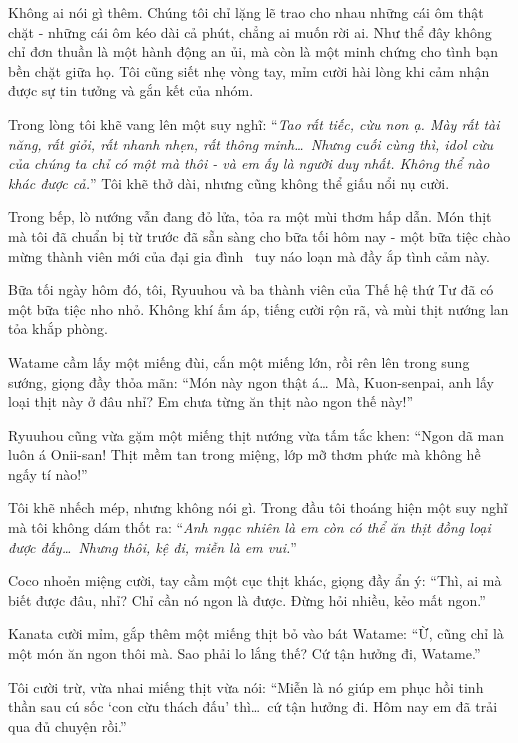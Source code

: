 \documentclass[../main.tex]{subfiles}
\begin{document}
Không ai nói gì thêm. Chúng tôi chỉ lặng lẽ trao cho nhau những cái ôm thật chặt - những cái ôm kéo dài cả phút, chẳng ai muốn rời ai. Như thể đây không chỉ đơn thuần là một hành động an ủi, mà còn là một minh chứng cho tình bạn bền chặt giữa họ. Tôi cũng siết nhẹ vòng tay, mỉm cười hài lòng khi cảm nhận được sự tin tưởng và gắn kết của nhóm.

Trong lòng tôi khẽ vang lên một suy nghĩ: ``\textit{Tao rất tiếc, cừu non ạ. Mày rất tài năng, rất giỏi, rất nhanh nhẹn, rất thông minh\dots\ Nhưng cuối cùng thì, idol cừu của chúng ta chỉ có một mà thôi - và em ấy là người duy nhất. Không thể nào khác được cả.}'' Tôi khẽ thở dài, nhưng cũng không thể giấu nổi nụ cười.

Trong bếp, lò nướng vẫn đang đỏ lửa, tỏa ra một mùi thơm hấp dẫn. Món thịt mà tôi đã chuẩn bị từ trước đã sẵn sàng cho bữa tối hôm nay - một bữa tiệc chào mừng thành viên mới của đại gia đình \hll\ tuy náo loạn mà đầy ắp tình cảm này.

\ct

Bữa tối ngày hôm đó, tôi, Ryuuhou và ba thành viên của Thế hệ thứ Tư đã có một bữa tiệc nho nhỏ. Không khí ấm áp, tiếng cười rộn rã, và mùi thịt nướng lan tỏa khắp phòng.

Watame cầm lấy một miếng đùi, cắn một miếng lớn, rồi rên lên trong sung sướng, giọng đầy thỏa mãn: ``Món này ngon thật á\dots\ Mà, Kuon-senpai, anh lấy loại thịt này ở đâu nhỉ? Em chưa từng ăn thịt nào ngon thế này!''

Ryuuhou cũng vừa gặm một miếng thịt nướng vừa tấm tắc khen: ``Ngon dã man luôn á Onii-san! Thịt mềm tan trong miệng, lớp mỡ thơm phức mà không hề ngấy tí nào!''

Tôi khẽ nhếch mép, nhưng không nói gì. Trong đầu tôi thoáng hiện một suy nghĩ mà tôi không dám thốt ra: ``\textit{Anh ngạc nhiên là em còn có thể ăn thịt đồng loại được đấy\dots\ Nhưng thôi, kệ đi, miễn là em vui.}''

Coco nhoẻn miệng cười, tay cầm một cục thịt khác, giọng đầy ẩn ý: ``Thì, ai mà biết được đâu, nhỉ? Chỉ cần nó ngon là được. Đừng hỏi nhiều, kẻo mất ngon.''

Kanata cười mỉm, gắp thêm một miếng thịt bỏ vào bát Watame: ``Ừ, cũng chỉ là một món ăn ngon thôi mà. Sao phải lo lắng thế? Cứ tận hưởng đi, Watame.''

Tôi cười trừ, vừa nhai miếng thịt vừa nói: ``Miễn là nó giúp em phục hồi tinh thần sau cú sốc `con cừu thách đấu' thì\dots\ cứ tận hưởng đi. Hôm nay em đã trải qua đủ chuyện rồi.''
\end{document}
